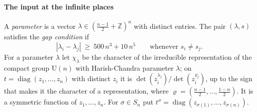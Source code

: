 \documentclass[10pt]{amsart}
\theoremstyle{definition}
\theoremstyle{remark}
\newcommand{\Z}{\mathbb Z}
\providecommand{\auU}{\mathrm U}
\begin{document}
\paragraph*{The input at the infinite places}
A \emph{parameter} is a vector $\lambda\in(\tfrac{n-1}2+\Z)^n$ with distinct entries. The pair
$(\lambda,s)$ satisfies the \emph{gap condition} if
\begin{equation}\label{pm:eq-gap}
|\lambda_i-\lambda_j|\ \ge\ 500\,n^3+10\,n^5\qquad\text{whenever }s_i\ne s_j .
\end{equation}
For a parameter $\lambda$ let $\chi_\lambda$ be the character of the irreducible representation of
the compact group $\auU(n)$ with Harish-Chandra parameter $\lambda$; on
$t=\operatorname{diag}(z_1,\dots,z_n)$ with distinct $z_i$ it is $\det(z_i^{\lambda_j})/\det(z_i^{
\varrho_j})$, up to the sign that makes it the character of a representation, where
$\varrho=(\tfrac{n-1}2,\dots,\tfrac{1-n}2)$. It is a symmetric function of $z_1,\dots,z_n$. For
$\sigma\in S_n$ put $t^\sigma=\operatorname{diag}(z_{\sigma(1)},\dots,z_{\sigma(n)})$.
\end{document}
